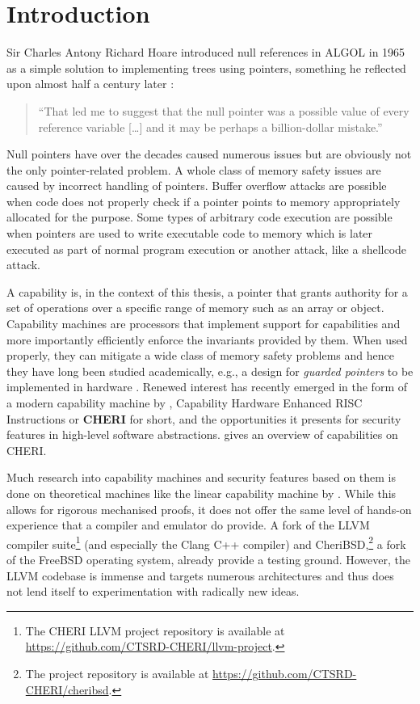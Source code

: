 \documentclass[main.tex]{subfiles}
\begin{document}
\onlyinsubfile{\mainmatter{}}

\chapter{Introduction}
Sir Charles Antony Richard Hoare introduced null references in ALGOL in 1965 as a simple solution to implementing trees using pointers, something he reflected upon almost half a century later \citep{null}:
\begin{quote}
	\enquote{That led me to suggest that the null pointer was a possible value of every reference variable […] and it may be perhaps a billion-dollar mistake.}
\end{quote}

Null pointers have over the decades caused numerous issues but are obviously not the only pointer-related problem. A whole class of memory safety issues are caused by incorrect handling of pointers. Buffer overflow attacks are possible when code does not properly check if a pointer points to memory appropriately allocated for the purpose. Some types of arbitrary code execution are possible when pointers are used to write executable code to memory which is later executed as part of normal program execution or another attack, like a shellcode attack.

A capability is, in the context of this thesis, a pointer that grants authority for a set of operations over a specific range of memory such as an array or object. Capability machines are processors that implement support for capabilities and more importantly efficiently enforce the invariants provided by them. When used properly, they can mitigate a wide class of memory safety problems and hence they have long been studied academically, e.g., a design for \emph{guarded pointers} to be implemented in hardware \citep{guardedptrs}. Renewed interest has recently emerged in the form of a modern capability machine by \citet{intro2cheri}, Capability Hardware Enhanced RISC Instructions or \textbf{CHERI} for short, and the opportunities it presents for security features in high-level software abstractions.  gives an overview of capabilities on CHERI.

Much research into capability machines and security features based on them is done on theoretical machines like the linear capability machine by \citet{stktokens}. While this allows for rigorous mechanised proofs, it does not offer the same level of hands-on experience that a compiler and emulator do provide. A fork of the LLVM compiler suite\footnote{The CHERI LLVM project repository is available at \url{https://github.com/CTSRD-CHERI/llvm-project}.} (and especially the Clang C++ compiler) and CheriBSD,\footnote{The project repository is available at \url{https://github.com/CTSRD-CHERI/cheribsd}.} a fork of the FreeBSD operating system, already provide a testing ground. However, the LLVM codebase is immense and targets numerous architectures and thus does not lend itself to experimentation with radically new ideas.
\end{document}
